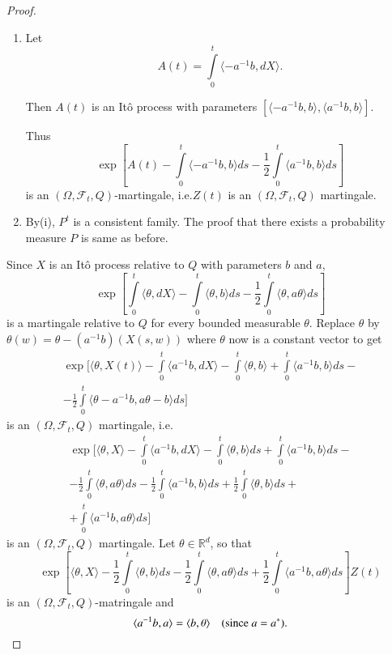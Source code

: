 \begin{proof}
\begin{enumerate}
\renewcommand{\theenumi}{\roman{enumi}}
\renewcommand{\labelenumi}{(\theenumi)}
\item Let
$$
A(t)=\int\limits^{t}_{0}\langle -a^{-1}b,dX\rangle.
$$

Then $A(t)$ is an It\^o process with parameters $[\langle
  -a^{-1}b,b\rangle, \langle a^{-1}b,b\rangle]$.

Thus 
$$
\exp [A(t)-\int\limits^{t}_{0}\langle -a^{-1}b, b\rangle
  ds-\frac{1}{2}\int\limits^{t}_{0}\langle a^{-1}b,b\rangle ds]
$$
is an $(\Omega,\mathscr{F}_{t},Q)$-martingale, i.e.\@ $Z(t)$ is an
$(\Omega,\mathscr{F}_{t},Q)$ martingale.

\item By\pageoriginale (i), $P^{t}$ is a consistent family. The proof
  that there exists a probability measure $P$ is same as before.
\end{enumerate}

Since $X$ is an It\^o process relative to $Q$ with parameters $b$ and
$a$,
$$
\exp[\int\limits^{t}_{0}\langle \theta,dX\rangle
  -\int\limits^{t}_{0}\langle \theta, b\rangle
  ds-\frac{1}{2}\int\limits^{t}_{0}\langle \theta, a\theta\rangle ds]
$$
is a martingale relative to $Q$ for every bounded measurable
$\theta$. Replace $\theta$ by $\theta(w)=\theta-(a^{-1}b)(X(s,w))$
where $\theta$ now is a constant vector to get
\begin{gather*}
\exp [\langle \theta, X(t)\rangle -\int\limits^{t}_{0}\langle
  a^{-1}b,dX\rangle -\int\limits^{t}_{0}\langle \theta, b\rangle
  +\int\limits^{t}_{0}\langle a^{-1}b,b\rangle ds-\\
-\frac{1}{2}\int\limits^{t}_{0}\langle \theta-a^{-1}b,a\theta-b\rangle ds]
\end{gather*}
is an $(\Omega,\mathscr{F}_{t},Q)$ martingale, i.e.
\begin{gather*}
\exp[\langle \theta, X\rangle -\int\limits^{t}_{0}\langle
  a^{-1}b,dX\rangle -\int\limits^{t}_{0}\langle \theta,b\rangle
  ds+\int\limits^{t}_{0}\langle a^{-1}b,b\rangle ds-\\
-\frac{1}{2}\int\limits^{t}_{0}\langle \theta, a\theta\rangle
ds-\frac{1}{2}\int\limits^{t}_{0}\langle a^{-1}b,b\rangle
ds+\frac{1}{2}\int\limits^{t}_{0}\langle \theta,b\rangle ds+\\
+\int\limits^{t}_{0}\langle a^{-1}b,a\theta\rangle ds]
\end{gather*}
is an $(\Omega,\mathscr{F}_{t},Q)$ martingale. Let $\theta\in
\mathbb{R}^{d}$, so that
$$
\exp[\langle \theta,X\rangle -\frac{1}{2}\int\limits^{t}_{0}\langle
  \theta,b\rangle ds-\frac{1}{2}\int\limits^{t}_{0}\langle \theta,
  a\theta\rangle ds +\frac{1}{2}\int\limits^{t}_{0}\langle a^{-1}b,
  a\theta\rangle ds]Z(t)
$$
is an $(\Omega, \mathscr{F}_{t},Q)$-matringale and
$$
\langle a^{-1}b,a\rangle =\langle b,\theta\rangle \quad(\text{since~ }
a=a^{*}).
$$


\end{proof}

